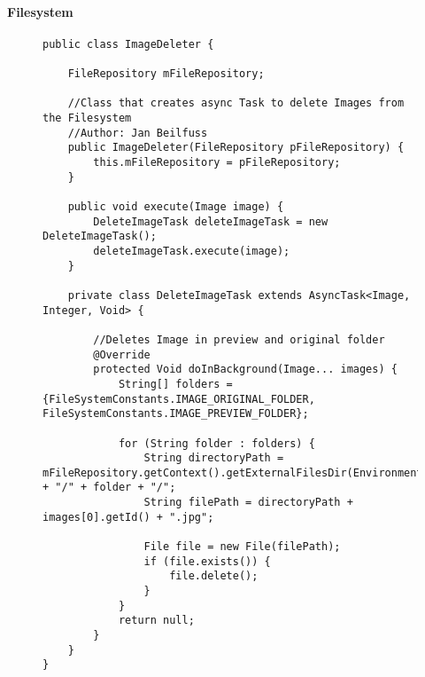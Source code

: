 		\paragraph{Filesystem}
\begin{figure}[H]
\begin{lstlisting}[caption=ImageDeleter (Jan Beilfuß)]
public class ImageDeleter {

    FileRepository mFileRepository;

    //Class that creates async Task to delete Images from the Filesystem
    //Author: Jan Beilfuss
    public ImageDeleter(FileRepository pFileRepository) {
        this.mFileRepository = pFileRepository;
    }

    public void execute(Image image) {
        DeleteImageTask deleteImageTask = new DeleteImageTask();
        deleteImageTask.execute(image);
    }

    private class DeleteImageTask extends AsyncTask<Image, Integer, Void> {

        //Deletes Image in preview and original folder
        @Override
        protected Void doInBackground(Image... images) {
            String[] folders = {FileSystemConstants.IMAGE_ORIGINAL_FOLDER, FileSystemConstants.IMAGE_PREVIEW_FOLDER};

            for (String folder : folders) {
                String directoryPath = mFileRepository.getContext().getExternalFilesDir(Environment.DIRECTORY_PICTURES).getAbsolutePath() + "/" + folder + "/";
                String filePath = directoryPath + images[0].getId() + ".jpg";

                File file = new File(filePath);
                if (file.exists()) {
                    file.delete();
                }
            }
            return null;
        }
    }
}
\end{lstlisting}
\end{figure}

